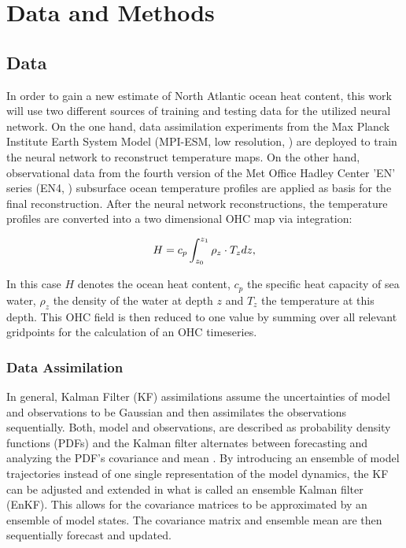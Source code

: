 \documentclass[Masterarbeit.tex]{subfile}
\begin{document}
	
	\chapter{Data and Methods} \label{data_methods}
	
	\section{Data} \label{data}
	
	In order to gain a new estimate of North Atlantic ocean heat content, this work will use two different sources of training and testing data for the utilized neural network. On the one hand, data assimilation experiments \citep{brune_preserving_2020} from the Max Planck Institute Earth System Model (MPI-ESM, low resolution, \cite{mauritsen_developments_2019}) are deployed to train the neural network to reconstruct temperature maps. On the other hand, observational data from the fourth version of the Met Office Hadley Center 'EN' series (EN4, \cite{good_en4_2013}) subsurface ocean temperature profiles are applied as basis for the final reconstruction. After the neural network reconstructions, the temperature profiles are converted into a two dimensional OHC map via integration:
	
	
	\begin{align}
	H = c_{p} \int_{z_0}^{z_1} \rho_z \cdot T_z dz ,
	\end{align}
	
	In this case $H$ denotes the ocean heat content, $c_{p}$ the specific heat capacity of sea water, $\rho_z$ the density of the water at depth $z$ and $T_z$ the temperature at this depth. This OHC field is then reduced to one value by summing over all relevant gridpoints for the calculation of an OHC timeseries.	
	
	
	\subsection{Data Assimilation} \label{data:assim}
	
	In general, Kalman Filter (KF) assimilations assume the uncertainties of model and observations to be Gaussian and then assimilates the observations sequentially. Both, model and observations, are described as probability density functions (PDFs) and the Kalman filter alternates between forecasting and analyzing the PDF's covariance and mean \cite{carrassi_data_2018}. By introducing an ensemble of model trajectories instead of one single representation of the model dynamics, the KF can be adjusted and extended in what is called an ensemble Kalman filter (EnKF). This allows for the covariance matrices to be approximated by an ensemble of model states. The covariance matrix and ensemble mean are then sequentially forecast and updated.\\
	
\end{document}
